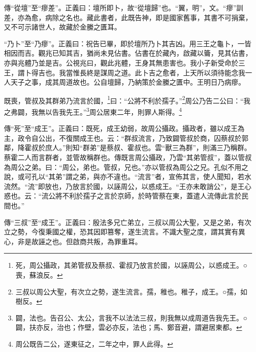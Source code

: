 {\noindent\zhuan{}\fzbyks 傳“從壇”至“瘳差”。正義曰：壇所即卜，故“從壇歸”也。“翼，明”，文。“瘳”訓差，亦為愈，病除之名也。藏此書者，此既告神，即是國家舊事，其書不可捐棄，又不可示諸世人，故藏於金縢之匱耳。 \par}

{\noindent\shu{}\fzkt “乃卜”至“乃瘳”。正義曰：祝告已畢，即於壇所乃卜其吉凶。用三王之龜卜，一皆相因而吉。觀兆已知其吉，猶尚未見佔書。佔書在於藏內，啟藏以籥，見其佔書，亦與兆體乃並是吉。公視兆曰，觀此兆體，王身其無患害也。我小子新受命於三王，謂卜得吉也。我當惟長終是謀周之道。此卜吉之愈者，上天所以須待能念我一人天子之事，成其周道故也。公自壇歸，乃納策於金縢之匱中。王明日乃病瘳。 \par}

既喪，管叔及其群弟乃流言於國，\footnote{死，周公攝政，其弟管叔及蔡叔、霍叔乃放言於國，以誣周公，以惑成王。○喪，蘇浪反。}曰：“公將不利於孺子。”\footnote{三叔以周公大聖，有次立之勢，遂生流言。孺，稚也。稚子，成王。○孺，如樹反。}周公乃告二公曰：“我之弗闢，我無以告我先王。”\footnote{闢，法也。告召公、太公，言我不以法法三叔，則我無以成周道告我先王。○闢，扶亦反，治也；作壁，雲必亦反，法也；馬、鄭音避，謂避居東都。}周公居東二年，則罪人斯得。\footnote{周公既告二公，遂東征之，二年之中，罪人此得。}


{\noindent\zhuan{}\fzbyks 傳“死”至“成王”。正義曰：既死，成王幼弱，故周公攝政。攝政者，雖以成王為主，政令自公出，不復關成王也。云：“群叔流言，乃致闢管叔於商，囚蔡叔於郭鄰，降霍叔於庶人。”則知“群弟”是蔡叔、霍叔也。雲“獸三為群”，則滿三乃稱群。蔡霍二人而言群者，並管故稱群也。傳既言周公攝政，乃雲“其弟管叔”，蓋以管叔為周公之弟。曰：“周公，弟也。管叔，兄也。”亦以管叔為周公之兄。孔似不用之說，或可孔以“其弟”謂之弟，與亦不違也。“流言”者，宣佈其言，使人聞知，若水流然。“流”即放也，乃放言於國，以誣周公，以惑成王。“王亦未敢誚公”，是王心惑也。云：“流公將不利於孺子之言於京師，於時管蔡在東，蓋遣人流傳此言於民間也。” \par}

{\noindent\zhuan{}\fzbyks 傳“三叔”至“成王”。正義曰：殷法多兄亡弟立，三叔以周公大聖，又是之弟，有次立之勢，今復秉國之權，恐其因即篡奪，遂生流言。不識大聖之度，謂其實有異心，非是故誣之也。但啟商共叛，為罪重耳。 \par}

